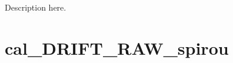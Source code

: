 Description here. \\ 










\clearpage
\newpage
\section{cal\_DRIFT\_RAW\_spirou}
\label{section:cal_DRIFT_RAW_spirou}

